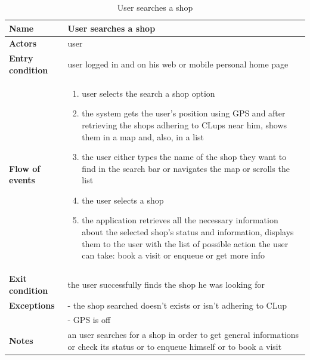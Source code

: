 \begin{table}[h!]
    \centering
    \begin{tabular}{@{}P{0.2\textwidth}P{0.70\textwidth}@{}}
        \toprule
        \textbf{Name}                 & User searches a shop\\
        \midrule
        \textbf{Actors}               & user\\
        \textbf{Entry condition}      & user logged in and on his web or mobile personal home page\\
        \textbf{Flow of events}       & 
        \begin{enumerate}[nolistsep, leftmargin=*]
            \item user selects the search a shop option
            \item the system gets the user's position using GPS and after retrieving the shops adhering to CLups near him, shows them in a map and, also, in a list
            \item the user either types the name of the shop they want to find in the search bar or navigates the map or scrolls the list
            \item the user selects a shop
            \item the application retrieves all the necessary information about the selected shop's status and information, displays them to the user with the list of possible action the user can take: book a visit or enqueue or get more info
        \end{enumerate} \\
        \textbf{Exit condition}       & the user successfully finds the shop he was looking for\\
        \textbf{Exceptions}           
        & - the shop searched doesn't exists or isn't adhering to CLup\\
        & - GPS is off\\
        \textbf{Notes} & an user searches for a shop in order to get general informations or check its status or to enqueue himself or to book a visit\\
        \bottomrule
    \end{tabular}
\caption{User searches a shop}
\label{table:usersearchesshop}
\end{table}

